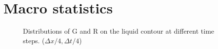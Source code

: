 \documentclass[a4paper,12pt]{article}
\begin{document}
%


\section{Macro statistics}

\begin{figure}[!ht]
     \hfill
     \caption{Distributions of G and R on the liquid contour at different time steps. ($\Delta x/4, \Delta t/4$)}
     \label{fig:Ech}
   \end{figure}
\end{document}
